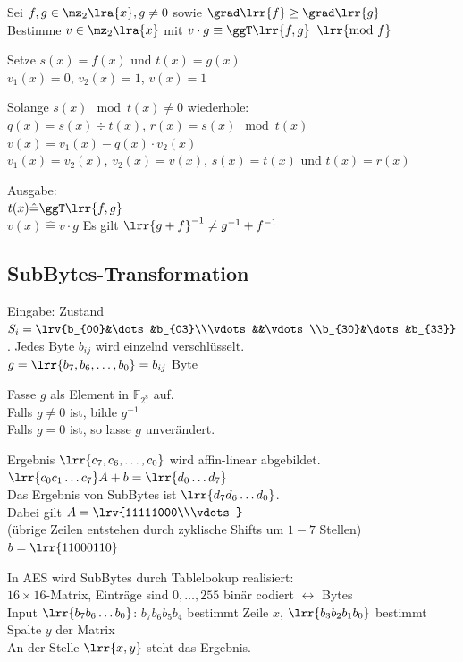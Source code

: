 		Sei $f,g\in \mz_2\lra{x}, g\neq 0$ sowie $\grad\lrr{f}\geq\grad\lrr{g}$\\
		Bestimme $v\in\mz_2\lra{x}$ mit $v\cdot g\equiv\ggT\lrr{f,g}\;\;\lrr{\mbox{mod } f}$
			\item Setze $s(x)=f(x)$ und $t(x)=g(x)$\\
				$v_1(x)=0$, $v_2(x)=1$, $v(x)=1$
			\item Solange $s(x)\mod t(x)\neq 0$ wiederhole:\\
				$q(x) =s(x)\div t(x)$, $r(x)=s(x)\mod t(x)$\\
				$v(x)=v_1(x)-q(x)\cdot v_2(x)$\\
				$v_1(x)=v_2(x)$, $v_2(x)=v(x)$, $s(x)=t(x)$ und $t(x)=r(x)$
			\item Ausgabe:\\
				$t(x) \hat{=}\ggT\lrr{f,g}$\\
				$v(x) \hat{=}v\cdot g$
		\subExEnd
		Es gilt $\lrr{g+f}^{-1}\neq g^{-1}+f^{-1}$
	
	\subsection{SubBytes-Transformation}
		Eingabe: Zustand $S_i=\lrv{b_{00}&\dots&b_{03}\\\vdots&&\vdots\\b_{30}&\dots&b_{33}}$.	Jedes Byte $b_{ij}$ wird einzelnd verschlüsselt.\\
		$g=\lrr{b_7,b_6,\dots,b_0} = b_{ij}$ Byte
	
			\item Fasse $g$ als Element in $\mathbb{F}_{2^8}$ auf.\\
				Falls $g\neq 0$ ist, bilde $g^{-1}$\\
				Falls $g=0$ ist, so lasse $g$ unverändert.
			\item Ergebnis $\lrr{c_7,c_6,\dots,c_0}$ wird affin-linear abgebildet.\\
				$\lrr{c_0c_1\dots c_7} A+b=\lrr{d_0\dots d_7}$\\
				Das Ergebnis von SubBytes ist $\lrr{d_7d_6\dots d_0}$.\\
				Dabei gilt $A=\lrv{11111000\\\vdots}$\\
				(übrige Zeilen entstehen durch zyklische Shifts um $1-7$ Stellen)\\
				$b=\lrr{11000110}$
		\subExEnd
		
		In AES wird SubBytes durch Tablelookup realisiert:\\
		$16\times 16$-Matrix, Einträge sind $0,\dots,255$ binär codiert $\leftrightarrow$ Bytes\\
		Input $\lrr{b_7b_6\dots b_0}$: $b_7b_6b_5b_4$ bestimmt Zeile $x$, $\lrr{b_3b_2b_1b_0}$ bestimmt Spalte $y$ der Matrix\\
		An der Stelle $\lrr{x,y}$ steht das Ergebnis.
		
